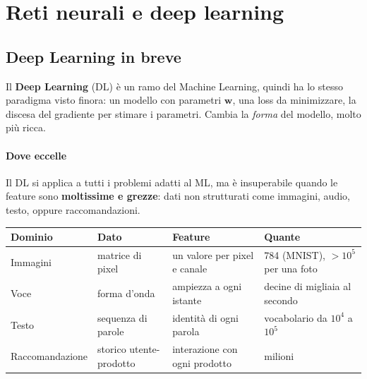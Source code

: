 \documentclass[12pt]{extarticle}
\begin{document}
\newpage

\section{Reti neurali e deep learning}

\subsection{Deep Learning in breve}

\noindent Il \textbf{Deep Learning} (DL) è un ramo del Machine Learning, quindi ha lo stesso paradigma visto finora: un modello con parametri $\mathbf{w}$, una loss da minimizzare, la discesa del gradiente per stimare i parametri. Cambia la \emph{forma} del modello, molto più ricca.

\begin{center}
\end{center}

\paragraph{Dove eccelle}
Il DL si applica a tutti i problemi adatti al ML, ma è insuperabile quando le feature sono \textbf{moltissime e grezze}: dati non strutturati come immagini, audio, testo, oppure raccomandazioni.

\begin{center}
\small
\setlength{\tabcolsep}{5pt}
\begin{tabular}{L{3.2cm}L{3.0cm}L{3.8cm}L{3.3cm}}
    \toprule
    \textbf{Dominio} & \textbf{Dato} & \textbf{Feature} & \textbf{Quante} \\
    \midrule
    Immagini & matrice di pixel & un valore per pixel e canale & 784 (MNIST), $>10^5$ per una foto \\
    Voce & forma d'onda & ampiezza a ogni istante & decine di migliaia al secondo \\
    Testo & sequenza di parole & identità di ogni parola & vocabolario da $10^4$ a $10^5$ \\
    Raccomandazione & storico utente-prodotto & interazione con ogni prodotto & milioni \\
    \bottomrule
\end{tabular}
\end{center}
\end{document}
